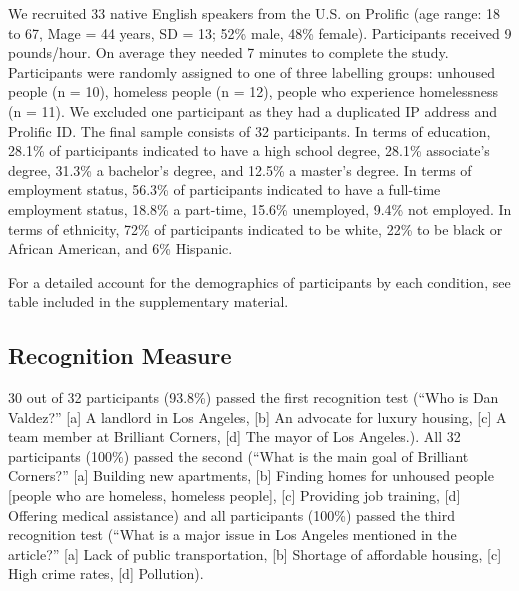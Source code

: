 \documentclass[
  man]{apa6}
\begin{document}
We recruited 33 native English speakers from the U.S. on Prolific (age range: 18 to
67, Mage = 44 years, SD = 13; 52\% male, 48\% female). Participants received 9
pounds/hour. On average they needed 7 minutes to complete the study. Participants
were randomly assigned to one of three labelling groups: unhoused people (n = 10),
homeless people (n = 12), people who experience homelessness (n = 11). We
excluded one participant as they had a duplicated IP address and Prolific ID. The final
sample consists of 32 participants. In terms of education, 28.1\% of participants
indicated to have a high school degree, 28.1\% associate's degree, 31.3\% a bachelor's
degree, and 12.5\% a master's degree. In terms of employment status, 56.3\% of
participants indicated to have a full-time employment status, 18.8\% a part-time, 15.6\%
unemployed, 9.4\% not employed. In terms of ethnicity, 72\% of participants indicated
to be white, 22\% to be black or African American, and 6\% Hispanic.

For a detailed account for the demographics of participants by each condition, see table included in the supplementary material.

\begin{table}
\centering
\caption{\label{tab:my-table}Summary of Demographic Variables by Condition}
\centering
{}
\end{table}

\hypertarget{recognition-measure-1}{%
\subsection{Recognition Measure}\label{recognition-measure-1}}

30 out of 32 participants (93.8\%) passed the first recognition test (``Who is Dan Valdez?'' {[}a{]} A landlord in Los Angeles, {[}b{]} An advocate for luxury housing, {[}c{]} A team member at Brilliant Corners, {[}d{]} The mayor of Los Angeles.). All 32 participants (100\%) passed the second (``What is the main goal of Brilliant Corners?'' {[}a{]} Building new apartments, {[}b{]} Finding homes for unhoused people {[}people who are homeless, homeless people{]}, {[}c{]} Providing job training, {[}d{]} Offering medical assistance) and all participants (100\%) passed the third recognition test (``What is a major issue in Los Angeles mentioned in the article?'' {[}a{]} Lack of public transportation, {[}b{]} Shortage of affordable housing, {[}c{]} High crime rates, {[}d{]} Pollution).
\end{document}
